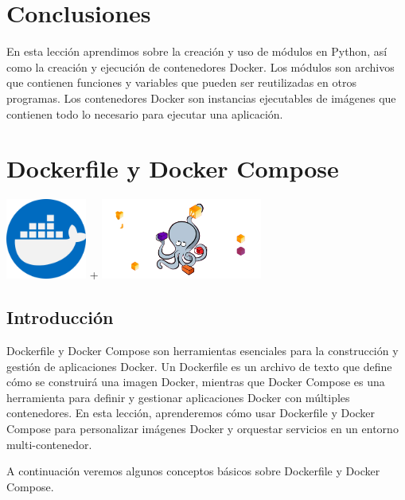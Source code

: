\documentclass[
  a4paper,
  DIV=11,
  numbers=noendperiod,
  onepage,
  openany]{scrreprt}
\begin{document}
\chapter{Conclusiones}\label{conclusiones-5}

En esta lección aprendimos sobre la creación y uso de módulos en Python,
así como la creación y ejecución de contenedores Docker. Los módulos son
archivos que contienen funciones y variables que pueden ser reutilizadas
en otros programas. Los contenedores Docker son instancias ejecutables
de imágenes que contienen todo lo necesario para ejecutar una
aplicación.

\chapter{Dockerfile y Docker Compose}\label{dockerfile-y-docker-compose}

\includegraphics[width=1.04167in,height=\textheight,keepaspectratio]{unidades/unidad4/./images/docker.png}
+
\includegraphics[width=2.08333in,height=\textheight,keepaspectratio]{unidades/unidad4/./images/1-docker-compose.png}

\section{Introducción}\label{introducciuxf3n-1}

Dockerfile y Docker Compose son herramientas esenciales para la
construcción y gestión de aplicaciones Docker. Un Dockerfile es un
archivo de texto que define cómo se construirá una imagen Docker,
mientras que Docker Compose es una herramienta para definir y gestionar
aplicaciones Docker con múltiples contenedores. En esta lección,
aprenderemos cómo usar Dockerfile y Docker Compose para personalizar
imágenes Docker y orquestar servicios en un entorno multi-contenedor.

A continuación veremos algunos conceptos básicos sobre Dockerfile y
Docker Compose.
\end{document}

